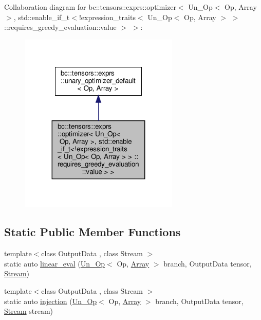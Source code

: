 Collaboration diagram for bc\+:\+:tensors\+:\+:exprs\+:\+:optimizer$<$ Un\+\_\+\+Op$<$ Op, Array $>$, std\+:\+:enable\+\_\+if\+\_\+t$<$!expression\+\_\+traits$<$ Un\+\_\+\+Op$<$ Op, Array $>$ $>$ \+:\+:requires\+\_\+greedy\+\_\+evaluation\+:\+:value $>$ $>$\+:\nopagebreak
\begin{figure}[H]
\begin{center}
\leavevmode
\includegraphics[width=215pt]{structbc_1_1tensors_1_1exprs_1_1optimizer_3_01Un__Op_3_01Op_00_01Array_01_4_00_01std_1_1enable__0d61fcfd2562ce88ad0d25dcb3fe3a4d}
\end{center}
\end{figure}
\subsection*{Static Public Member Functions}
\begin{DoxyCompactItemize}
\item 
{\footnotesize template$<$class Output\+Data , class Stream $>$ }\\static auto \hyperlink{structbc_1_1tensors_1_1exprs_1_1optimizer_3_01Un__Op_3_01Op_00_01Array_01_4_00_01std_1_1enable__66b812e276696f18c9c03b5fec72f8f7_aa492aa30cb645813ab26793cb479f172}{linear\+\_\+eval} (\hyperlink{structbc_1_1tensors_1_1exprs_1_1Un__Op}{Un\+\_\+\+Op}$<$ Op, \hyperlink{structbc_1_1tensors_1_1exprs_1_1Array}{Array} $>$ branch, Output\+Data tensor, \hyperlink{classbc_1_1streams_1_1Stream}{Stream})
\item 
{\footnotesize template$<$class Output\+Data , class Stream $>$ }\\static auto \hyperlink{structbc_1_1tensors_1_1exprs_1_1optimizer_3_01Un__Op_3_01Op_00_01Array_01_4_00_01std_1_1enable__66b812e276696f18c9c03b5fec72f8f7_aff9ac697177a730b232e26c8cc97d86d}{injection} (\hyperlink{structbc_1_1tensors_1_1exprs_1_1Un__Op}{Un\+\_\+\+Op}$<$ Op, \hyperlink{structbc_1_1tensors_1_1exprs_1_1Array}{Array} $>$ branch, Output\+Data tensor, \hyperlink{classbc_1_1streams_1_1Stream}{Stream} stream)
\end{DoxyCompactItemize}
